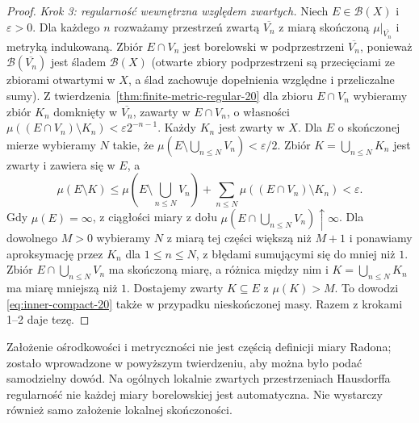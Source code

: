 \begin{proof}
\emph{Krok 3: regularność wewnętrzna względem zwartych.}
Niech $E\in\mathcal B(X)$ i $\varepsilon>0$.
Dla każdego $n$ rozważamy przestrzeń zwartą
$\overline{V_n}$ z miarą skończoną
$\mu|_{\overline{V_n}}$ i metryką indukowaną.
Zbiór $E\cap V_n$ jest borelowski w podprzestrzeni $\overline{V_n}$, ponieważ $\mathcal B(\overline{V_n})$ jest śladem $\mathcal B(X)$ (otwarte zbiory podprzestrzeni są przecięciami ze zbiorami otwartymi w $X$, a ślad zachowuje dopełnienia względne i przeliczalne sumy). Z twierdzenia~\ref{thm:finite-metric-regular-20}
dla zbioru $E\cap V_n$ wybieramy zbiór
$K_n$ domknięty w $\overline{V_n}$, zawarty w
$E\cap V_n$, o własności
$\mu((E\cap V_n)\setminus K_n)<\varepsilon2^{-n-1}$.
Każdy $K_n$ jest zwarty w $X$.
Dla $E$ o skończonej mierze wybieramy $N$ takie, że
$\mu(E\setminus\bigcup_{n\le N}V_n)<\varepsilon/2$.
Zbiór $K=\bigcup_{n\le N}K_n$ jest zwarty i zawiera się
w $E$, a
\[
 \mu(E\setminus K)
 \le\mu(E\setminus\bigcup_{n\le N}V_n)
 +\sum_{n\le N}\mu((E\cap V_n)\setminus K_n)
 <\varepsilon.
\]
Gdy $\mu(E)=\infty$, z ciągłości miary z dołu
$\mu(E\cap\bigcup_{n\le N}V_n)\uparrow\infty$.
Dla dowolnego $M>0$ wybieramy $N$ z miarą tej części
większą niż $M+1$ i ponawiamy aproksymację przez
$K_n$ dla $1\le n\le N$, z błędami sumującymi się do mniej niż $1$. Zbiór $E\cap\bigcup_{n\le N}V_n$ ma skończoną miarę, a różnica między nim i $K=\bigcup_{n\le N}K_n$ ma miarę mniejszą niż $1$. Dostajemy zwarty $K\subseteq E$ z $\mu(K)>M$.
To dowodzi \eqref{eq:inner-compact-20} także w przypadku
nieskończonej masy. Razem z krokami 1--2 daje tezę.
\end{proof}

\begin{uwaga}
Założenie ośrodkowości i metryczności nie jest częścią
definicji miary Radona; zostało wprowadzone w powyższym
twierdzeniu, aby można było podać samodzielny dowód.
Na ogólnych lokalnie zwartych przestrzeniach Hausdorffa
regularność nie każdej miary borelowskiej jest automatyczna.
Nie wystarczy również samo założenie lokalnej skończoności.
\end{uwaga}

